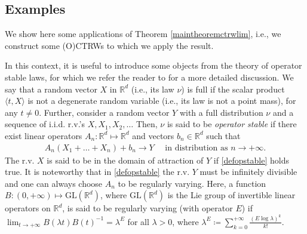 \documentclass[reqno]{amsart}
\theoremstyle{remark}
\numberwithin{equation}{section} %
\newcommand{\1}{\mathds{1}}
\begin{document}
	\subsection{Examples}
	We show here some applications of Theorem \ref{maintheoremctrwlim}, i.e., we construct some (O)CTRWs to which we apply the result.
	
	In this context, it is useful to introduce some objects from the theory of operator stable laws, for which we refer the reader to \cite{meerschaert2001limit} for a more detailed discussion. We say that a random vector $X$ in $\mathbb{R}^d$ (i.e., its law $\nu$) is full if the scalar product $\langle t, X \rangle$ is not a degenerate random variable (i.e., its law is not a point mass), for any $t \neq 0$. Further, consider a random vector $Y$ with a full distribution $\nu$ and a sequence of i.i.d. r.v.'s $X, X_1, X_2, \dots$ Then, $\nu$ is said to be \emph{operator stable} if there exist linear operators $A_n : \mathbb{R}^d \mapsto \mathbb{R}^d$ and vectors $b_n \in \mathbb{R}^d$ such that
	\begin{align}
		A_n (X_1 + \dots + X_n ) + b_n \to Y \quad \text{ in distribution as $n\to+\infty$.}
		\label{defopstable}
	\end{align}
	The r.v. $X$ is said to be in the domain of attraction of $Y$ if \eqref{defopstable} holds true. It is noteworthy that in \eqref{defopstable} the r.v. $Y$ must be infinitely divisible and one can always choose $A_n$ to be regularly varying. Here, a function $B:(0, +\infty) \mapsto \text{GL}(\mathbb{R}^d)$, where $\text{GL}(\mathbb{R}^d)$ is the Lie group of invertible linear operators on $\mathbb{R}^d$, is said to be regularly varying (with operator $E$) if $\lim_{t \to +\infty}B( \lambda t) B(t)^{-1}= \lambda^E$ for all $\lambda >0$, where $\lambda^E  \coloneqq \sum_{k=0}^{+\infty} \frac{(E \log \lambda)^k}{k!}$.
	
\end{document}
